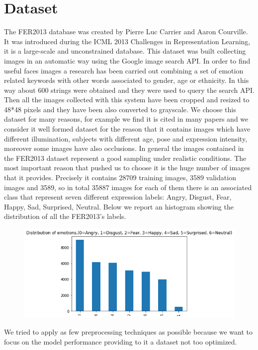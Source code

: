 \documentclass[10pt,twocolumn,letterpaper]{article}
\begin{document}
\section{Dataset}
The FER2013 database was created by Pierre Luc Carrier and Aaron Courville.
It was introduced during the ICML 2013 Challenges in Representation Learning,
it is a large-scale and unconstrained database.
This dataset was built collecting images in an automatic way using the Google image search API.
In order to find useful faces images
a research has been carried out combining a set of emotion related keywords with other words associated
to gender, age or ethnicity.
In this way about 600 strings were obtained and they were used to query the search API.
Then all the images collected with this system have been cropped and resized to 48*48 pixels
and they have been also converted to grayscale.
We choose this dataset for many reasons, for example we find it is cited in many papers and we consider it well formed dataset for the reason that it contains
images which have different illumination, subjects with different age, pose and expression intensity, moreover some images
have also occlusions. In general the images contained in the FER2013 dataset represent a good sampling under realistic conditions.
The most important reason that pushed us to choose it is the huge number of images that it provides.
Precisely it contains 28709 training images, 3589 validation images and 3589, so in total 35887
images for each of them there is an associated class that represent seven different expression labels: Angry, Disgust, Fear, Happy, Sad, Surprised, Neutral.
Below we report an histogram showing the distribution of all the FER2013's labels.
\begin{figure}[H]
   \centering
   \includegraphics[width=1\linewidth]{./immagini/7_classi.png}
\end{figure}
We tried to apply as few preprocessing techniques as possible because we want to focus on the model performance providing to it a dataset not too optimized.
\end{document}
